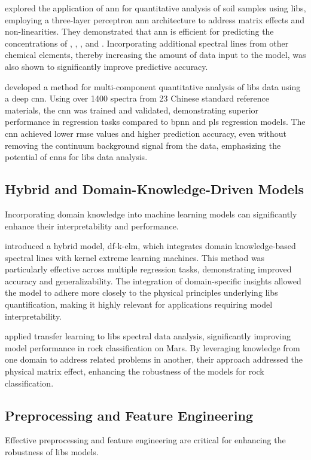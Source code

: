 \citet{el_haddad_ann_2013} explored the application of \gls{ann} for quantitative analysis of soil samples using \gls{libs}, employing a three-layer perceptron \gls{ann} architecture to address matrix effects and non-linearities.
They demonstrated that \gls{ann} is efficient for predicting the concentrations of , , , and .
Incorporating additional spectral lines from other chemical elements, thereby increasing the amount of data input to the model, was also shown to significantly improve predictive accuracy.

\citet{li2020cnn} developed a method for multi-component quantitative analysis of \gls{libs} data using a deep \gls{cnn}.
Using over 1400 spectra from 23 Chinese standard reference materials, the \gls{cnn} was trained and validated, demonstrating superior performance in regression tasks compared to \gls{bpnn} and \gls{pls} regression models.
The \gls{cnn} achieved lower \gls{rmse} values and higher prediction accuracy, even without removing the continuum background signal from the data, emphasizing the potential of \gls{cnn}s for \gls{libs} data analysis.

\subsection{Hybrid and Domain-Knowledge-Driven Models}
Incorporating domain knowledge into machine learning models can significantly enhance their interpretability and performance.

\citet{song_DF-K-ELM} introduced a hybrid model, \gls{df}-\gls{k-elm}, which integrates domain knowledge-based spectral lines with kernel extreme learning machines.
This method was particularly effective across multiple regression tasks, demonstrating improved accuracy and generalizability.
The integration of domain-specific insights allowed the model to adhere more closely to the physical principles underlying \gls{libs} quantification, making it highly relevant for applications requiring model interpretability.

\citet{sunMachineLearningTransfer2021} applied transfer learning to \gls{libs} spectral data analysis, significantly improving model performance in rock classification on Mars.
By leveraging knowledge from one domain to address related problems in another, their approach addressed the physical matrix effect, enhancing the robustness of the models for rock classification.

\subsection{Preprocessing and Feature Engineering}
Effective preprocessing and feature engineering are critical for enhancing the robustness of \gls{libs} models.

